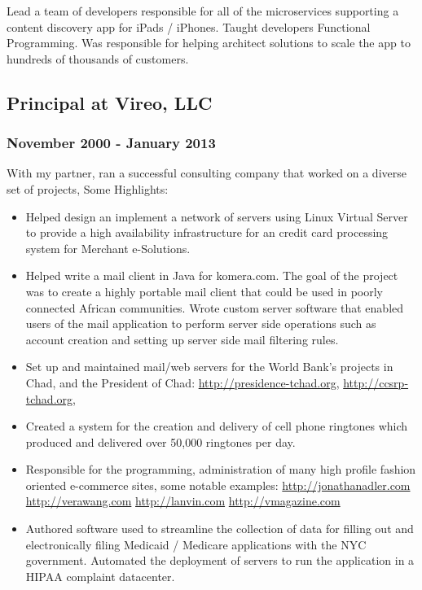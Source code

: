 \documentclass[letterpaper]{article}
\begin{document}
Lead a team of developers responsible for all of the microservices
supporting a content discovery app for iPads / iPhones. Taught
developers Functional Programming. Was responsible for helping
architect solutions to scale the app to hundreds of thousands of
customers.

\subsection{Principal at Vireo, LLC}
\label{sec-2-4}
\subsubsection{November 2000 - January 2013}
\label{sec-2-4-1}
\vspace{0.1in}

With my partner, ran a successful consulting company that worked on a
diverse set of projects, Some Highlights:
\begin{itemize}
\item Helped design an implement a network of servers using Linux Virtual
Server to provide a high availability infrastructure for an credit
card processing system for Merchant e-Solutions.
\item Helped write a mail client in Java for komera.com.  The goal of the
project was to create a highly portable mail client that could be
used in poorly connected African communities.  Wrote custom server
software that enabled users of the mail application to perform
server side operations such as account creation and setting up
server side mail filtering rules.
\item Set up and maintained mail/web servers for the World Bank's projects
in Chad, and the President of Chad: \url{http://presidence-tchad.org}, \url{http://ccsrp-tchad.org},
\item Created a system for the creation and delivery of cell phone
ringtones which produced and delivered over 50,000 ringtones per day.
\item Responsible for the programming, administration of many high profile
fashion oriented e-commerce sites, some notable examples:
\url{http://jonathanadler.com} \url{http://verawang.com} \url{http://lanvin.com} \url{http://vmagazine.com}
\item Authored software used to streamline the collection of data for
filling out and electronically filing Medicaid / Medicare
applications with the NYC government. Automated the deployment of
servers to run the application in a HIPAA complaint datacenter.
\end{itemize}
\end{document}
